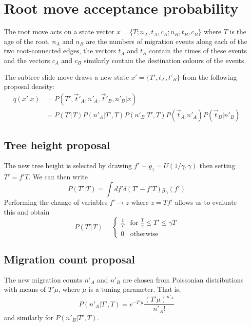 \documentclass[a4paper, 11pt]{article}
\begin{document}
\section{Root move acceptance probability}

The root move acts on a state vector $x=\{T;n_A,t_A,c_A;n_B,t_B,c_B\}$
where $T$ is the age of the root, $n_A$ and $n_B$ are the numbers of
migration events along each of the two root-connected edges, the
vectors $t_A$ and $t_B$ contain the times of these events and the
vectors $c_A$ and $c_B$ similarly contain the destination colours of
the events.

The subtree slide move draws a new state $x'=\{T',t_A,t'_B\}$
from the following proposal density:
\begin{align}
  q(x'|x) &= P(T',\vec{t}'_A,n'_A,\vec{t}'_B,n'_B|x) \nonumber \\
& = P(T'|T)P(n'_A|T',T)P(n'_B|T',T)P(\vec{t}_A|n'_A)P(\vec{t}_B|n'_B)
\end{align}

\subsection{Tree height proposal}

The new tree height is selected by drawing $f'\sim g_\gamma=U(1/\gamma,\gamma)$
then setting $T'=f'T$. We can then write
\begin{equation}
  P(T'|T)=\int df'\delta(T'-f'T)g_\gamma(f')
\end{equation}
Performing the change of variables $f'\rightarrow z$ where $z=Tf'$
allows us to evaluate this and obtain
\begin{equation}
  P(T'|T)=\left\{\begin{array}{rl}
\frac{1}{T} & \text{for } \frac{T}{\gamma}\leq T' \leq\gamma T\\
0 & \text{otherwise}
\end{array}\right.
\end{equation}

\subsection{Migration count proposal}

The new migration counts $n'_A$ and $n'_B$ are chosen from Poissonian
distributions with means of $T'\mu$, where $\mu$ is a tuning
parameter.  That is,
\begin{equation}
  P(n'_A|T',T)=e^{-T'\mu}\frac{(T'\mu)^{n'_A}}{n'_A!}
\end{equation}
and similarly for $P(n'_B|T',T)$.
\end{document}

